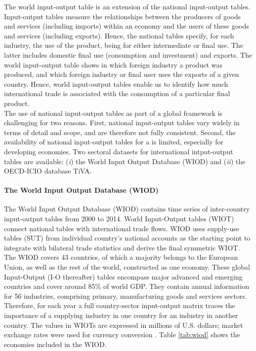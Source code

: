 \documentclass[11pt,a4paper]{article}
\begin{document}
The world input-output table is an extension of the national input-output tables. Input-output tables measure the relationships between the producers of goods and services (including imports) within an economy and the users of these goods and services (including exports). Hence, the national tables specify, for each industry, the use of the product, being for either intermediate or final use. The latter includes domestic final use (consumption and investment) and exports. The world input-output table shows in which foreign industry a product was produced, and which foreign industry or final user uses the exports of a given country. Hence, world input-output tables enable us to identify how much international trade is associated with the consumption of a particular final product. \\
The use of national input-output tables as part of a global framework is challenging for two reasons. First, national input-output tables vary widely in terms of detail and scope, and are therefore not fully consistent. Second, the availability of national input-output tables for a is limited, especially for developing economies. 
Two sectoral datasets for international intput-output tables are available: (\textit{i}) the World Input Output Database (WIOD) and (\textit{ii}) the OECD-ICIO database TiVA.
\paragraph{The World Input Output Database (WIOD)}
The World Input Output Database (WIOD) contains time series of inter-country input-output tables from 2000 to 2014.  World Input-Output tables (WIOT) connect national tables with international trade flows. WIOD uses supply-use tables (SUT) from individual country's national accounts as the starting point to integrate with bilateral trade statistics and derive the final symmetric WIOT. The WIOD covers 43 countries, of which a majority belongs to the European Union, as well as the rest of the world, constructed as one economy. 
These global Input-Output (I-O thereafter) tables encompass major advanced and emerging countries and cover around 85$\%$ of world GDP. They contain annual information for 56 industries, comprising primary, manufacturing goods and services sectors. Therefore, for each year a full country-sector input-output matrix traces the importance of a supplying industry in one country for an industry in another country. The values in WIOTs are expressed in millions of U.S. dollars; market exchange rates were used for currency conversion \citep{TimmerIllustratedUserGuide2015}. %
Table \ref{tab:wiod} shows the economies included in the WIOD.
 
\end{document}
